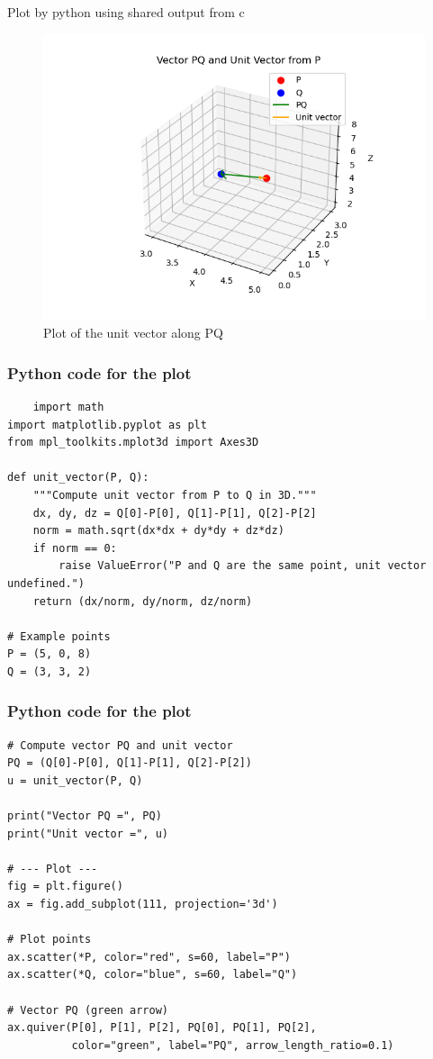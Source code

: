 \documentclass{beamer}
\begin{document}
\begin{frame}{Plot by python using shared output from c}
	\begin{center}
	\begin{figure}[H]
		\centering
		\includegraphics[width = 0.7\columnwidth]{figs/Figure2.png}
		\caption{Plot of the unit vector along PQ}
		\label{fig1}
	\end{figure}
	\end{center}
\end{frame}
\begin{frame}[fragile]
     \frametitle{Python code for the plot}
\begin{lstlisting}
    import math
import matplotlib.pyplot as plt
from mpl_toolkits.mplot3d import Axes3D

def unit_vector(P, Q):
    """Compute unit vector from P to Q in 3D."""
    dx, dy, dz = Q[0]-P[0], Q[1]-P[1], Q[2]-P[2]
    norm = math.sqrt(dx*dx + dy*dy + dz*dz)
    if norm == 0:
        raise ValueError("P and Q are the same point, unit vector undefined.")
    return (dx/norm, dy/norm, dz/norm)

# Example points
P = (5, 0, 8)
Q = (3, 3, 2)
\end{lstlisting}
\end{frame}
\begin{frame}[fragile]
   \frametitle{Python code for the plot}
    \begin{lstlisting}
# Compute vector PQ and unit vector
PQ = (Q[0]-P[0], Q[1]-P[1], Q[2]-P[2])
u = unit_vector(P, Q)

print("Vector PQ =", PQ)
print("Unit vector =", u)

# --- Plot ---
fig = plt.figure()
ax = fig.add_subplot(111, projection='3d')

# Plot points
ax.scatter(*P, color="red", s=60, label="P")
ax.scatter(*Q, color="blue", s=60, label="Q")

# Vector PQ (green arrow)
ax.quiver(P[0], P[1], P[2], PQ[0], PQ[1], PQ[2],
          color="green", label="PQ", arrow_length_ratio=0.1)
 \end{lstlisting}
\end{frame}
\end{document}
